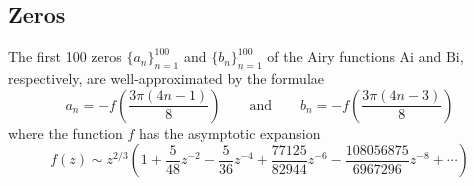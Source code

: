 \documentclass[11pt, a4paper]{article}
\newcommand{\eqtext}[1]{\qquad \text{#1} \qquad}
\newcommand{\Ai}{\mathrm{Ai}}
\newcommand{\Bi}{\mathrm{Bi}}
\begin{document}
\subsection{Zeros}
The first 100 zeros $ \{a_{n}\}_{n=1}^{100} $ and $ \{b_{n}\}_{n=1}^{100} $ of the Airy functions $ \Ai $ and $ \Bi $, respectively, are well-approximated by the formulae
\begin{equation}
	a_{n} = -f\left(\frac{3\pi(4n-1)}{8}\right) \eqtext{and} b_{n} = -f\left(\frac{3\pi(4n-3)}{8}\right) \label{airy:eq:zeros}
\end{equation}
where the function $ f $ has the asymptotic expansion
\begin{equation*}
	f(z) \sim z^{2/3}\left(1 + \frac{5}{48}z^{-2} - \frac{5}{36}z^{-4} + \frac{77125}{82944}z^{-6} - \frac{108056875}{6967296}z^{-8} + \cdots\right)
\end{equation*}
\end{document}
